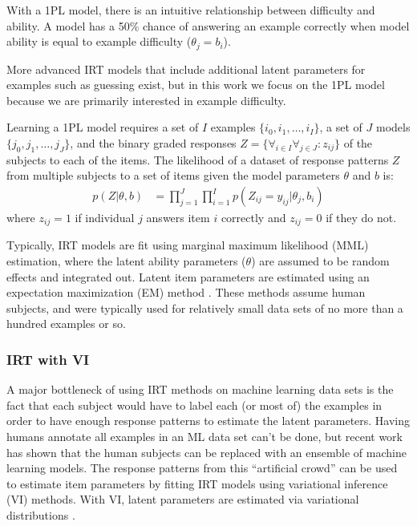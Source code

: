 \documentclass[letterpaper]{article} %
\begin{document}
With a 1PL model, there is an intuitive relationship between difficulty and ability.
A model has a 50\% chance of answering an example correctly when model ability is equal to example difficulty ($\theta_j = b_i$).

More advanced IRT models that include additional latent parameters for examples such as guessing exist, but in this work we focus on the 1PL model because we are primarily interested in example difficulty.

Learning a 1PL model requires a set of $I$ examples $\{i_0, i_1, \dots, i_I\}$, a set of $J$ models $\{j_0, j_1, \dots, j_J\}$, and the binary graded responses $Z = \{\forall_{i \in I} \forall_{j \in J}: z_{ij}\}$ of the subjects to each of the items.
The likelihood of a dataset of response patterns $Z$ from multiple subjects to a set of items given the model parameters $\theta$ and $b$ is:
\begin{align} 
p(Z \vert \theta, b) &= \prod_{j=1}^J \prod_{i=1}^I p(Z_{ij}=y_{ij} \vert \theta_j, b_i)
\end{align} 
where $z_{ij} = 1$ if individual $j$ answers item $i$ correctly and $z_{ij} = 0$ if they do not.

Typically, IRT models are fit using marginal maximum likelihood (MML) estimation, where the latent ability parameters ($\theta$) are assumed to be random effects and integrated out.
Latent item parameters are estimated using an expectation maximization (EM) method \cite{bock_marginal_1981}.
These methods assume human subjects, and were typically used for relatively small data sets of no more than a hundred examples or so.


\subsubsection{IRT with VI} 
A major bottleneck of using IRT methods on machine learning data sets is the fact that each subject would have to label each (or most of) the examples in order to have enough response patterns to estimate the latent parameters.
Having humans annotate all examples in an ML data set can't be done, but recent work has shown that the human subjects can be replaced with an ensemble of machine learning models. 
The response patterns from this ``artificial crowd'' can be used to estimate item parameters by fitting IRT models using variational inference (VI) methods.
With VI, latent parameters are estimated via variational distributions \cite{natesan_bayesian_2016,lalor_learning_2019}. 
\end{document}
